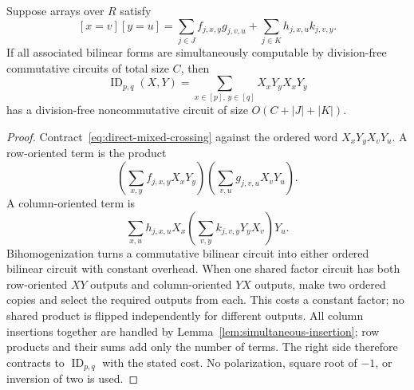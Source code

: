 \begin{lemma}
\label{lem:direct-mixed-crossing}
Suppose arrays over $R$ satisfy
\begin{equation}
\label{eq:direct-mixed-crossing}
 [x=v][y=u]
 =\sum_{j\in J} f_{j,x,y}g_{j,v,u}
  +\sum_{j\in K} h_{j,x,u}k_{j,v,y}.
\end{equation}
If all associated bilinear forms are simultaneously computable by
division-free commutative circuits of total size $C$, then
\[
 \operatorname{ID}_{p,q}(X,Y)
   =\sum_{x\in[p],\,y\in[q]}X_xY_yX_xY_y
\]
has a division-free noncommutative circuit of size
$O(C+|J|+|K|)$.
\end{lemma}

\begin{proof}
Contract~\eqref{eq:direct-mixed-crossing} against the ordered word
$X_xY_yX_vY_u$. A row-oriented term is the product
\[
 \left(\sum_{x,y}f_{j,x,y}X_xY_y\right)
 \left(\sum_{v,u}g_{j,v,u}X_vY_u\right).
\]
A column-oriented term is
\[
 \sum_{x,u}h_{j,x,u}X_x
   \left(\sum_{v,y}k_{j,v,y}Y_yX_v\right)Y_u.
\]
Bihomogenization turns a commutative bilinear circuit into either
ordered bilinear circuit with constant overhead. When one shared
factor circuit has both row-oriented $XY$ outputs and column-oriented
$YX$ outputs, make two ordered copies and select the required outputs
from each. This costs a constant factor; no shared product is flipped
independently for different outputs. All column insertions
together are handled by Lemma~\ref{lem:simultaneous-insertion}; row
products and their sums add only the number of terms. The right side
therefore contracts to $\operatorname{ID}_{p,q}$ with the stated cost.
No polarization, square root of $-1$, or inversion of two is used.
\end{proof}
